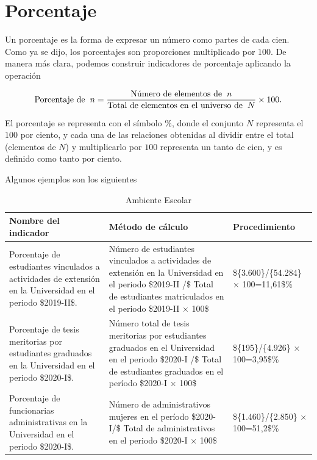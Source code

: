 \documentclass[
  11pt,
]{book}
\begin{document}
\hypertarget{porcentaje}{%
\chapter{Porcentaje}\label{porcentaje}}

Un porcentaje es la forma de expresar un número como partes de cada cien. Como ya se dijo, los porcentajes son proporciones multiplicado por \(100\). De manera más clara, podemos construir indicadores de porcentaje aplicando la operación

\[\begin{equation}
\text{Porcentaje de}\hspace{2mm}n=\frac{\text{Número de elementos de}\hspace{2mm}n}{\text{Total de elementos en el universo de}\hspace{2mm} N}\times 100.
\end{equation}\]

El porcentaje se representa con el símbolo \(\%\), donde el conjunto \(N\) representa el \(100\) por ciento, y cada una de las relaciones obtenidas al dividir entre el total (elementos de \(N\)) y multiplicarlo por \(100\) representa un tanto de cien, y es definido como tanto por ciento.

Algunos ejemplos son los siguientes

\begin{table}

\caption{\label{tab:unnamed-chunk-5}Ambiente Escolar}
\centering
\begin{tabular}[t]{l|l|l}
\hline
Nombre del indicador & Método de cálculo & Procedimiento\\
\hline
Porcentaje de estudiantes vinculados a actividades de extensión en la Universidad en el periodo \$2019-II\$. & Número de estudiantes vinculados a actividades de extensión en la Universidad en el periodo \$2019-II /\$ Total de estudiantes matriculados en el periodo \$2019-II × 100\$ & \$\{3.600\}/\{54.284\} × 100=11,61\$\%\\
\hline
Porcentaje de tesis meritorias por estudiantes graduados en la Universidad en el periodo \$2020-I\$. & Número total de tesis meritorias por estudiantes graduados en el Universidad en el periodo \$2020-I /\$ Total de estudiantes graduados en el período \$2020-I × 100\$ & \$\{195\}/\{4.926\} × 100=3,95\$\%\\
\hline
Porcentaje de funcionarias administrativas en la Universidad en el periodo \$2020-I\$. & Número de administrativos mujeres en el período \$2020-I/\$ Total de administrativos en el periodo \$2020-I × 100\$ & \$\{1.460\}/\{2.850\} × 100=51,2\$\%\\
\hline
\end{tabular}
\end{table}
\end{document}
